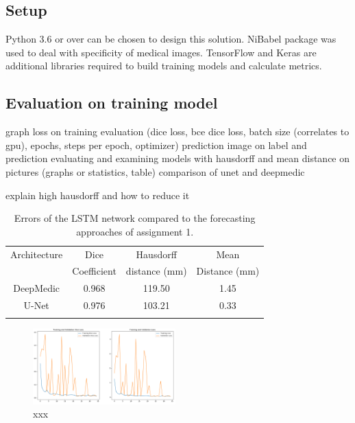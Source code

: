 
\subsection{Setup}

Python 3.6 or over can be chosen to design this solution. NiBabel package was used to deal with specificity of medical images. TensorFlow and Keras are additional libraries required to build training models and calculate metrics.

\subsection{Evaluation on training model}
graph loss on training evaluation (dice loss, bce dice loss, batch size (correlates to gpu), epochs, steps per epoch, optimizer)
prediction
image on label and prediction 
evaluating and examining models with hausdorff and mean distance on pictures (graphs or statistics, table)
comparison of unet and deepmedic

explain high hausdorff and how to reduce it

\begin{table}[h!]
	\centering
	\setlength{\tabcolsep}{10pt}
	\renewcommand{\arraystretch}{1.5}
	\begin{tabular}{c c c c}
		\hline 
		Architecture & Dice & Hausdorff & Mean \\
		& Coefficient & distance (mm) & Distance (mm) \\ 
		\hline 
		DeepMedic & 0.968 & 119.50 & 1.45 \\ 
		U-Net & 0.976 & 103.21 & 0.33 \\ 
		\hline
		\newline 
	\end{tabular}
	\caption{Errors of the LSTM network compared to the forecasting approaches of assignment 1.}
	\label{table_result}
\end{table}


\begin{figure}[h!]
	\includegraphics[width=0.49\textwidth, angle=0]{files/jpgunettrain.png}
	\caption{xxx}
	\label{scan_picture}
\end{figure}

